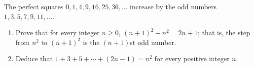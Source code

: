 The perfect squares $0,1,4,9,16,25,36,\dots$ increase by the odd numbers $1,3,5,7,9,11,\dots$.
\begin{enumerate}
\item[(a)] Prove that for every integer $n\ge0$, $(n+1)^2-n^2=2n+1$; that is, the step from $n^2$ to $(n+1)^2$ is the $(n+1)$st odd number.
\item[(b)] Deduce that $1+3+5+\cdots+(2n-1)=n^2$ for every positive integer $n$.
\end{enumerate}
